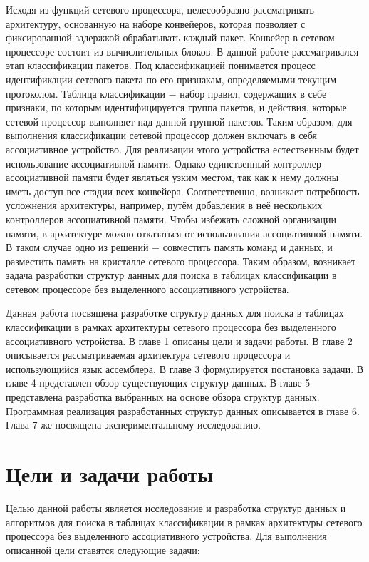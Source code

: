 \documentclass[a4paper, 12pt, titlepage, finall]{extreport}
\begin{document}
        Исходя из функций сетевого процессора, целесообразно рассматривать архитектуру, основанную на
        наборе конвейеров, которая позволяет с фиксированной задержкой обрабатывать каждый пакет. 
        Конвейер в сетевом процессоре состоит из вычислительных блоков. В данной работе рассматривался этап классификации пакетов. 
        Под классификацией понимается процесс идентификации сетевого пакета по его признакам, определяемыми текущим протоколом.
        Таблица классификации $-$ набор правил, содержащих в себе признаки, по которым идентифицируется группа пакетов,
        и действия, которые сетевой процессор выполняет над данной группой пакетов. 
        Таким образом, для выполнения классификации сетевой процессор должен включать в себя ассоциативное устройство. Для реализации этого устройства естественным будет использование 
        ассоциативной памяти. Однако единственный контроллер ассоциативной памяти будет являться узким местом, так как к нему должны иметь доступ все стадии всех конвейера.
        Соответственно, возникает потребность усложнения архитектуры, например, путём добавления в неё нескольких контроллеров ассоциативной памяти.
        Чтобы избежать сложной организации памяти, в архитектуре можно отказаться от использования ассоциативной памяти. 
        В таком случае одно из решений $-$ совместить память команд и данных, и разместить память на кристалле сетевого процессора.
        Таким образом, возникает задача разработки структур данных для поиска в таблицах классификации в сетевом процессоре без выделенного ассоциативного устройства.
        
        Данная работа посвящена разработке структур данных для поиска в таблицах классификации в рамках архитектуры сетевого процессора без выделенного ассоциативного
        устройства. В главе 1 описаны цели и задачи работы. В главе 2 описывается рассматриваемая архитектура сетевого процессора и использующийся язык ассемблера.
        В главе 3 формулируется постановка задачи. В главе 4 представлен обзор существующих структур данных.
        В главе 5 представлена разработка выбранных на основе обзора структур данных. Программная реализация разработанных структур данных описывается в главе 6. 
        Глава 7 же посвящена экспериментальному исследованию.


    \chapter{Цели и задачи работы}
        Целью данной работы является исследование и разработка структур данных и алгоритмов для поиска в таблицах классификации 
        в рамках архитектуры сетевого процессора без выделенного ассоциативного устройства.
        Для выполнения описанной цели ставятся следующие задачи:
\end{document}
